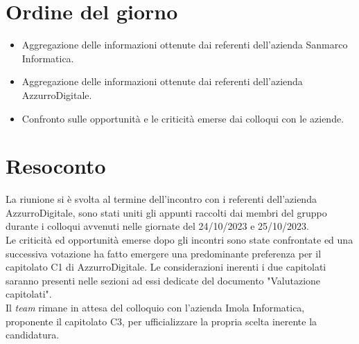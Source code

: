 \section{Ordine del giorno}
\begin{itemize}
    \item Aggregazione delle informazioni ottenute dai referenti dell'azienda Sanmarco Informatica.
    \item Aggregazione delle informazioni ottenute dai referenti dell'azienda AzzurroDigitale.
    \item Confronto sulle opportunità e le criticità emerse dai colloqui con le aziende.
\end{itemize}

\section{Resoconto}
La riunione si è svolta al termine dell'incontro con i referenti dell'azienda AzzurroDigitale, sono stati uniti gli appunti raccolti dai membri del gruppo durante i colloqui avvenuti nelle giornate del 24/10/2023 e 25/10/2023. \\

\noindent
Le criticità ed opportunità emerse dopo gli incontri sono state confrontate ed una successiva votazione ha fatto emergere una predominante preferenza per il capitolato C1 di AzzurroDigitale.
Le considerazioni inerenti i due capitolati saranno presenti nelle sezioni ad essi dedicate del documento "Valutazione capitolati". \\

\noindent
Il \textit{team} rimane in attesa del colloquio con l'azienda Imola Informatica, proponente il capitolato C3, per ufficializzare la propria scelta inerente la candidatura.

